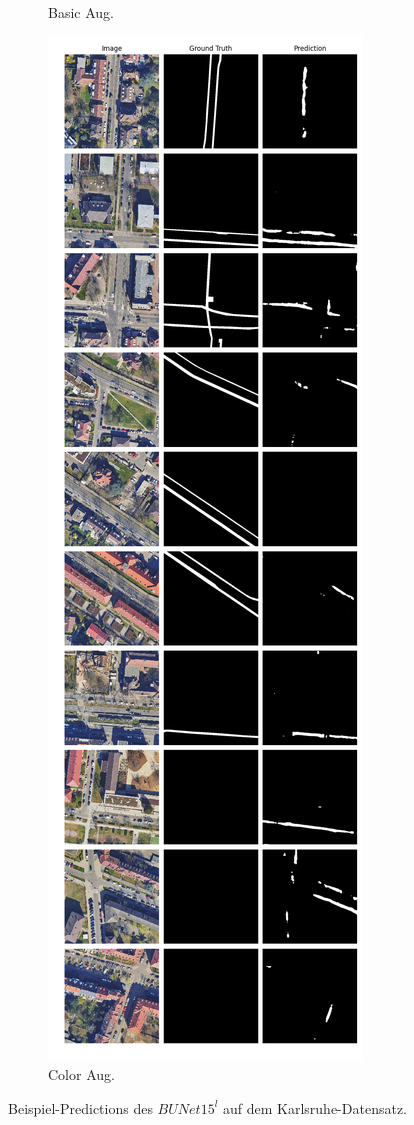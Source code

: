 \begin{figure}
\begin{subfigure}{.4\textwidth}
		\caption{Basic Aug.}
	\end{subfigure}
	\begin{subfigure}{.4\textwidth}
		\centering
		\includegraphics[width=1.\textwidth]{Bilder/karlsruhe-color-samples/bunet15-l.png}
		\caption{Color Aug.}
	\end{subfigure}
	\caption{Beispiel-Predictions des $BUNet15^l$ auf dem Karlsruhe-Datensatz.}
	\label{fig:ka-samples-bunet15-l}
	\end{figure}
	

